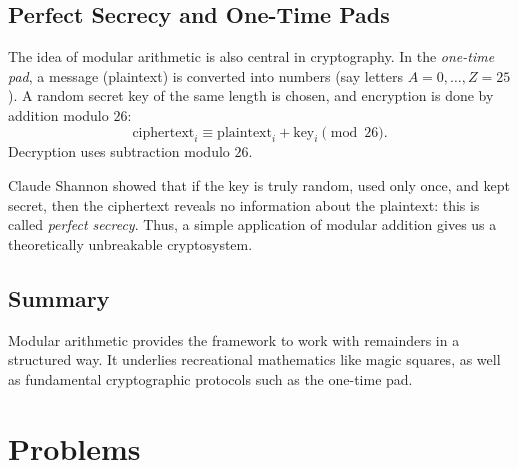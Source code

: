 \subsection{Perfect Secrecy and One-Time Pads}
The idea of modular arithmetic is also central in cryptography.  
In the \emph{one-time pad}, a message (plaintext) is converted into numbers 
(say letters $A=0,\dots,Z=25$). A random secret key of the same length is chosen, 
and encryption is done by addition modulo $26$:
\[
\text{ciphertext}_i \equiv \text{plaintext}_i + \text{key}_i \pmod{26}.
\]
Decryption uses subtraction modulo $26$.  

Claude Shannon showed that if the key is truly random, used only once, and kept secret, 
then the ciphertext reveals no information about the plaintext: this is called 
\emph{perfect secrecy}. Thus, a simple application of modular addition gives us 
a theoretically unbreakable cryptosystem.

\subsection*{Summary}
Modular arithmetic provides the framework to work with remainders in a structured way. 
It underlies recreational mathematics like magic squares, as well as fundamental 
cryptographic protocols such as the one-time pad.


\section*{Problems}

